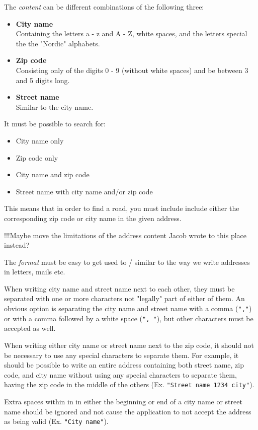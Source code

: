 \documentclass[a4paper,11pt]{article}
\begin{document}
The \textit{content} can be different combinations of the following three:
\begin{itemize}
	\item \textbf{City name} \\
		Containing the letters a - z and A - Z, white spaces, and the letters special the the "Nordic" alphabets.
	\item \textbf{Zip code} \\
		Consisting only of the digits 0 - 9 (without white spaces) and be between 3 and 5 digits long.
	\item \textbf{Street name} \\
		Similar to the city name.
\end{itemize}
It must be possible to search for:
\begin{itemize}
	\item City name only
	\item Zip code only
	\item City name and zip code
	\item Street name with city name and/or zip code
\end{itemize}
This means that in order to find a road, you must include include either the corresponding zip code or city name in the given address.

!!!Maybe move the limitations of the address content Jacob wrote to this place instead?

The \textit{format} must be easy to get used to / similar to the way we write addresses in letters, mails etc.

When writing city name and street name next to each other, they must be separated with one or more characters not "legally" part of either of them. An obvious option is separating the city name and street name with a comma (\texttt{","}) or with a comma followed by a white space (\texttt{", "}), but other characters must be accepted as well.

When writing either city name or street name next to the zip code, it should not be necessary to use any special characters to separate them. For example, it should be possible to write an entire address containing both street name, zip code, and city name without using any special characters to separate them, having the zip code in the middle of the others (Ex. \texttt{"Street name 1234 city"}).

Extra spaces within in in either the beginning or end of a city name or street name should be ignored and not cause the application to not accept the address as being valid (Ex. \texttt{"City    name"}).
\end{document}
